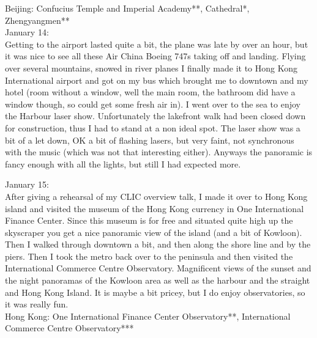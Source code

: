 Beijing: Confucius Temple and Imperial Academy**, Cathedral*, Zhengyangmen**\\

January 14:\\
Getting to the airport lasted quite a bit, the plane was late by over an hour, but it was nice to see all these Air China Boeing 747s taking off and landing. Flying over several mountains, snowed in river planes I finally made it to Hong Kong International airport and got on my bus which brought me to downtown and my hotel (room without a window, well the main room, the bathroom did have a window though, so could get some fresh air in). I went over to the sea to enjoy the Harbour laser show. Unfortunately the lakefront walk had been closed down for construction, thus I had to stand at a non ideal spot. The laser show was a bit of a let down, OK a bit of flashing lasers, but very faint, not synchronous with the music (which was not that interesting either). Anyways the panoramic is fancy enough with all the lights, but still I had expected more.\

January 15:\\
After giving a rehearsal of my CLIC overview talk, I made it over to Hong Kong island and visited the museum of the Hong Kong currency in One International Finance Center. Since this museum is for free and situated quite high up the skyscraper you get a nice panoramic view of the island (and a bit of Kowloon). Then I walked through downtown a bit, and then along the shore line and by the piers. Then I took the metro back over to the peninsula and then visited the International Commerce Centre Observatory. Magnificent views of the sunset and the night panoramas of the Kowloon area as well as the harbour and the straight and Hong Kong Island. It is maybe a bit pricey, but I do enjoy observatories, so it was really fun.\\

Hong Kong: One International Finance Center Observatory**, International Commerce Centre Observatory***\\

